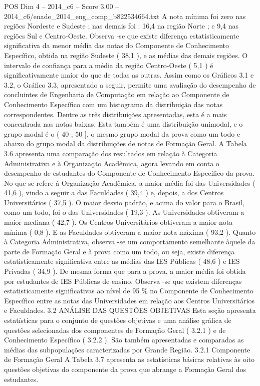 \begin{textsample}{POS Dim 4 – 2014\_c6 – Score 3.00 – 2014\_c6/enade\_2014\_eng\_comp\_b822534664.txt}
A nota mínima foi zero nas regiões Nordeste e Sudeste ; nas demais foi : 16,4 na região Norte ; e 9,4 nas regiões Sul e Centro-Oeste.
Observa -se que existe diferença estatisticamente significativa da menor média das notas do Componente de Conhecimento Específico, obtida na região Sudeste ( 38,1 ), e as médias das demais regiões.
O intervalo de confiança para a média da região Centro-Oeste ( 5,1 ) é significativamente maior do que de todas as outras.
Assim como os Gráficos 3.1 e 3.2, o Gráfico 3.3, apresentado a seguir, permite uma avaliação do desempenho de concluintes de Engenharia de Computação em relação ao Componente de Conhecimento Específico com um histograma da distribuição das notas correspondentes.
Dentre as três distribuições apresentadas, esta é a mais concentrada nas notas baixas.
Esta também é uma distribuição unimodal, e o grupo modal é o ( 40 ; 50 ], o mesmo grupo modal da prova como um todo e abaixo do grupo modal da distribuições de notas de Formação Geral.
A Tabela 3.6 apresenta uma comparação dos resultados em relação à Categoria Administrativa e à Organização Acadêmica, agora levando em conta o desempenho de estudantes do Componente de Conhecimento Específico da prova.
No que se refere à Organização Acadêmica, a maior média foi das Universidades ( 41,6 ), vindo a seguir a das Faculdades ( 39,4 ) e, depois, a dos Centros Universitários ( 37,5 ).
O maior desvio padrão, e acima do valor para o Brasil, como um todo, foi o das Universidades ( 19,3 ).
As Universidades obtiveram a maior mediana ( 42,7 ).
Os Centros Universitários obtiveram a maior nota mínima ( 0,8 ).
E as Faculdades obtiveram a maior nota máxima ( 93,2 ).
Quanto à Categoria Administrativa, observa -se um comportamento semelhante àquele da parte de Formação Geral e à prova como um todo, ou seja, existe diferença estatisticamente significativa entre as médias das IES Públicas ( 48,6 ) e IES Privadas ( 34,9 ).
De mesma forma que para a prova, a maior média foi obtida por estudantes de IES Públicas de ensino.
Observa -se que existem diferenças estatisticamente significativas ao nível de 95 \% no Componente de Conhecimento Específico entre as notas das Universidades em relação aos Centros Universitários e Faculdades. 3.2 ANÁLISE DAS QUESTÕES OBJETIVAS Esta seção apresenta estatísticas para o conjunto de questões objetivas e uma análise gráfica de questões selecionadas dos componentes de Formação Geral ( 3.2.1 ) e de Conhecimento Específico ( 3.2.2 ).
São também apresentadas e comparadas as médias das subpopulações caracterizadas por Grande Região. 3.2.1 Componente de Formação Geral A Tabela 3.7 apresenta as estatísticas básicas relativas às oito questões objetivas do componente da prova que abrange a Formação Geral dos estudantes.

\end{textsample}
